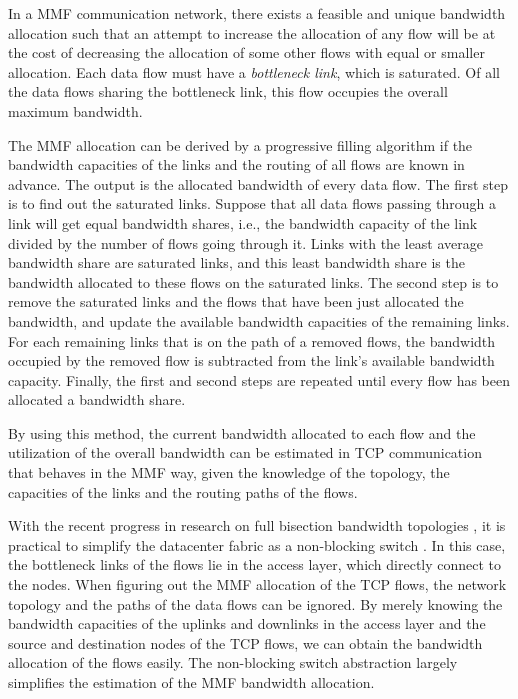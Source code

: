 \documentclass[10pt,journal,compsoc]{IEEEtran}
\begin{document}
In a MMF communication network, there
exists a feasible and unique bandwidth allocation
such that an attempt to increase the allocation of any flow will be
at the cost of decreasing the allocation of some other
flows with equal or smaller allocation.
Each data flow must have a \emph{bottleneck link}, which is saturated.
Of all the data flows sharing the bottleneck link, this flow
occupies the overall maximum bandwidth.

The MMF allocation can be derived by a progressive filling
algorithm if the bandwidth capacities of the links and the routing of all flows
are known in advance. %
The output is the allocated bandwidth of every data flow. 
The first step is to find out the saturated links.
Suppose that all data flows passing through a link will get equal
bandwidth shares,
i.e., the bandwidth capacity of the link divided by the number of
flows going through it. 
Links with the least average bandwidth share are saturated links,
and this least bandwidth share is the bandwidth allocated to these
flows on the saturated links.
The second step is to remove the saturated links and the flows that have been just allocated the bandwidth, and update %
the available bandwidth capacities of the remaining links.
For each remaining links that is on the path of a removed flows, 
the bandwidth occupied by the removed flow is subtracted
from the link's available bandwidth capacity. 
Finally, the first and second steps are repeated 
until every flow has been allocated
a bandwidth share.

By using this method, the current bandwidth allocated to
each flow and the utilization of the overall bandwidth can be estimated
in TCP communication that behaves in the MMF way, given
the knowledge of the topology, the capacities of the links and the
routing paths of the flows.

With the recent progress in research on full bisection bandwidth
topologies \cite{greenberg2009vl2, alizadeh2014conga, niranjan2009portland}, 
it is practical to simplify the datacenter fabric as a non-blocking switch \cite{%
chowdhury2011managing, alizadeh2013pfabric, kang2013optimizing, chowdhury2014efficient, chowdhury2015efficient}. 
In this case, the bottleneck links of the flows lie in
the access layer, which directly connect to the nodes.
When figuring out the MMF allocation of the TCP flows,
the network topology and the paths of the data flows
can be ignored. By merely knowing the bandwidth capacities of the
uplinks and downlinks in the access layer
and the source and destination nodes of the TCP flows, we can obtain
the bandwidth allocation of the flows easily. 
The non-blocking switch abstraction largely simplifies the estimation of the MMF bandwidth allocation. 
\end{document}
